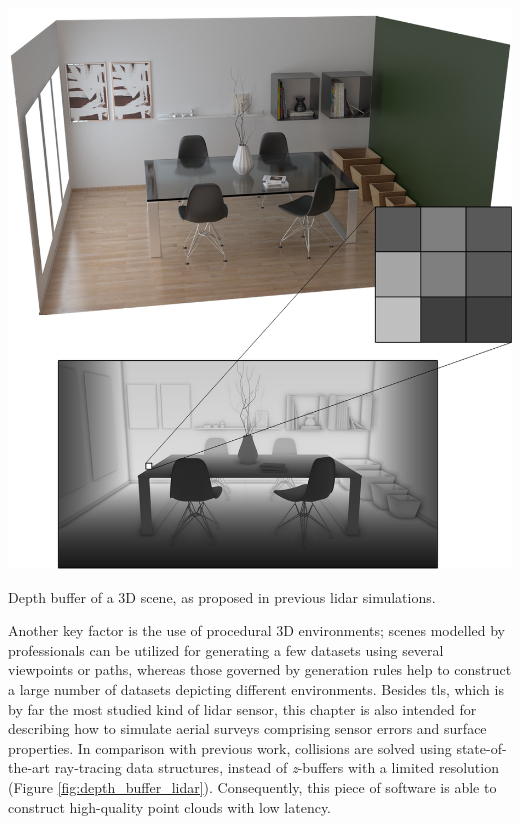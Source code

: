 \begin{marginfigure}[6cm]
    \centering
    \includegraphics[width=\linewidth]{figs/lidar_simulation/depth_buffer.png}
	\caption{Depth buffer of a 3D scene, as proposed in previous \acrshort{lidar} simulations. }
	\label{fig:depth_buffer_lidar}
\end{marginfigure}
Another key factor is the use of procedural 3D environments; scenes modelled by professionals can be utilized for generating a few datasets using several viewpoints or paths, whereas those governed by generation rules help to construct a large number of datasets depicting different environments. Besides \acrshort{tls}, which is by far the most studied kind of \acrshort{lidar} sensor, this chapter is also intended for describing how to simulate aerial surveys comprising sensor errors and surface properties. In comparison with previous work, collisions are solved using state-of-the-art ray-tracing data structures, instead of \textit{z}-buffers with a limited resolution (Figure \ref{fig:depth_buffer_lidar}). Consequently, this piece of software is able to construct high-quality point clouds with low latency. 


